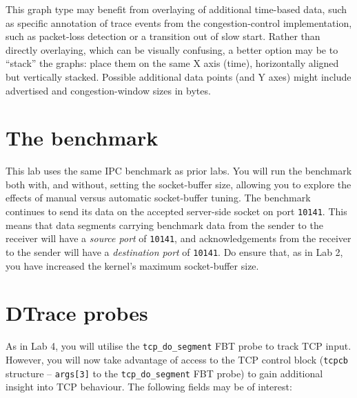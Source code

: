 \documentclass[a4paper,10pt]{article}
\begin{document}
This graph type
may benefit from overlaying of additional time-based data, such as
specific annotation of trace events from the congestion-control
implementation, such as packet-loss detection or a transition out of slow
start.
Rather than directly overlaying, which can be visually confusing, a better
option may be to ``stack'' the graphs: place them on the same X axis (time),
horizontally aligned but vertically stacked.
Possible additional data points (and Y axes) might include advertised and
congestion-window sizes in bytes.

\section*{The benchmark}

This lab uses the same IPC benchmark as prior labs.
You will run the benchmark both with, and without, setting the socket-buffer
size, allowing you to explore the effects of manual versus automatic
socket-buffer tuning.
The benchmark continues to send its data on the accepted server-side socket on
port \texttt{10141}.
This means that data segments carrying benchmark data from the sender to the
receiver will have a \textit{source port} of \texttt{10141}, and
acknowledgements from the receiver to the sender will have a
\textit{destination port} of \texttt{10141}.
Do ensure that, as in Lab 2, you have increased the kernel's maximum 
socket-buffer size.

\section*{DTrace probes}

%
%
As in Lab 4, you will utilise the \texttt{tcp\_do\_segment} FBT probe to track
TCP input.
However, you will now take advantage of access to the TCP control block
(\texttt{tcpcb} structure -- \texttt{args[3]} to the \texttt{tcp\_do\_segment}
FBT probe) to gain additional insight into TCP behaviour.
The following fields may be of interest:
\end{document}
